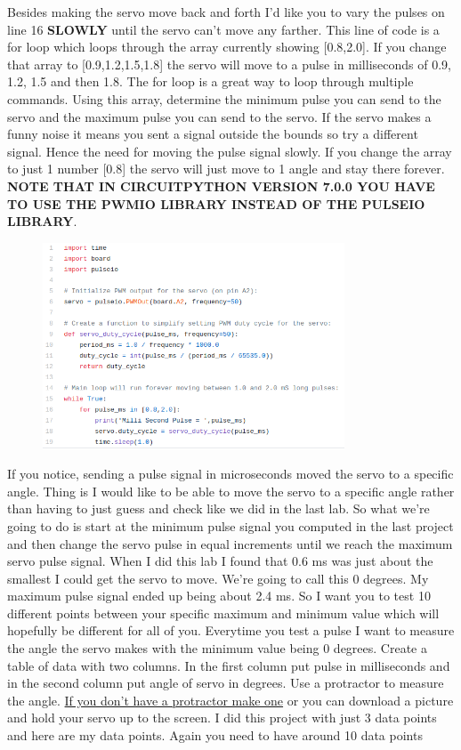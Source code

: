 Besides making the servo move back and forth I’d like you to vary the pulses on line 16 {\bf SLOWLY} until the servo can’t move any farther. This line of code is a for loop which loops through the array currently showing [0.8,2.0]. If you change that array to [0.9,1.2,1.5,1.8] the servo will move to a pulse in milliseconds of 0.9, 1.2, 1.5 and then 1.8. The for loop is a great way to loop through multiple commands. Using this array, determine the minimum pulse you can send to the servo and the maximum pulse you can send to the servo. If the servo makes a funny noise it means you sent a signal outside the bounds so try a different signal. Hence the need for moving the pulse signal slowly. If you change the array to just 1 number [0.8] the servo will just move to 1 angle and stay there forever. {\bf NOTE THAT IN CIRCUITPYTHON VERSION 7.0.0 YOU HAVE TO USE THE PWMIO LIBRARY INSTEAD OF THE PULSEIO LIBRARY}.
\begin{figure}[H]
  \begin{center}
    \includegraphics[width=0.8\textwidth]{Figures/servo_code.png}
  \end{center}
\end{figure}
If you notice, sending a pulse signal in microseconds moved the servo to a specific angle. Thing is I would like to be able to move the servo to a specific angle rather than having to just guess and check like we did in the last lab. So what we’re going to do is start at the minimum pulse signal you computed in the last project and then change the servo pulse in equal increments until we reach the maximum servo pulse signal. When I did this lab I found that 0.6 ms was just about the smallest I could get the servo to move. We’re going to call this 0 degrees. My maximum pulse signal ended up being about 2.4 ms. So I want you to test 10 different points between your specific maximum and minimum value which will hopefully be different for all of you. Everytime you test a pulse I want to measure the angle the servo makes with the minimum value being 0 degrees. Create a table of data with two columns. In the first column put pulse in milliseconds and in the second column put angle of servo in degrees. Use a protractor to measure the angle. \href{https://www.youtube.com/watch?v=XSLzcwTOsWk}{If you don’t have a protractor make one} or you can download a picture and hold your servo up to the screen. I did this project with just 3 data points and here are my data points. Again you need to have around 10 data points
